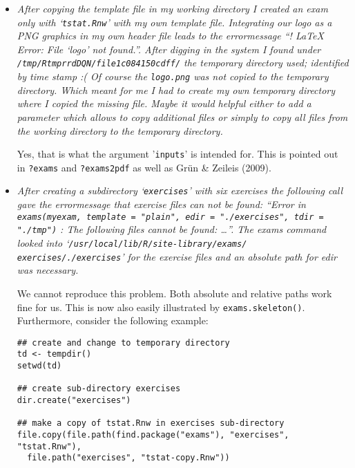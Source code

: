 \documentclass[a4paper]{article}
\begin{document}
\begin{itemize}
Third, the manuscript now recommends explicitly not to start with customization
of a specific layout in {\LaTeX} but to rather start by creating some (simple)
.Rnw exercises and rendering them into different output formats. Adaptation
of existing .Rnw exercises should hopefully be easier after creating local
copies in a directory via \texttt{exams.skeleton()}.

\item {\it
After copying the template file in my working directory I created an exam
only with `\texttt{tstat.Rnw}' with my own template file.  Integrating our logo as
a PNG graphics in my own header file leads to the errormessage ``!  LaTeX
Error: File `logo' not found.''.  After digging in the system I found under
\texttt{/tmp/RtmprrdDQN/file1c084150cdff/} the temporary directory used; identified
by time stamp :( Of course the \texttt{logo.png} was not copied to the temporary
directory.  Which meant for me I had to create my own temporary directory
where I copied the missing file.  Maybe it would helpful either to add a
parameter which allows to copy additional files or simply to copy all
files from the working directory to the temporary directory.}

Yes, that is what the argument '\texttt{inputs}' is intended for. This is pointed out
in \texttt{?exams} and \texttt{?exams2pdf} as well as Gr\"un \& Zeileis (2009).

\item {\it
After creating a subdirectory `\texttt{exercises}' with six exercises the following
call gave the errormessage that exercise files can not be found: ``Error in
\texttt{exams(myexam, template = "plain", edir = "./exercises", tdir = "./tmp")} :
The following files cannot be found: \dots''.  The exams command looked into
`\texttt{/usr/local/lib/R/site-library/exams/} \texttt{exercises/./exercises}' for the
exercise files and an absolute path for edir was necessary.}

We cannot reproduce this problem. Both absolute and relative paths work fine
for us. This is now also easily illustrated by \texttt{exams.skeleton()}. Furthermore,
consider the following example:
\begin{verbatim}
## create and change to temporary directory
td <- tempdir()
setwd(td)

## create sub-directory exercises
dir.create("exercises")

## make a copy of tstat.Rnw in exercises sub-directory
file.copy(file.path(find.package("exams"), "exercises", "tstat.Rnw"),
  file.path("exercises", "tstat-copy.Rnw"))


\end{verbatim}
\end{itemize}
\end{document}
